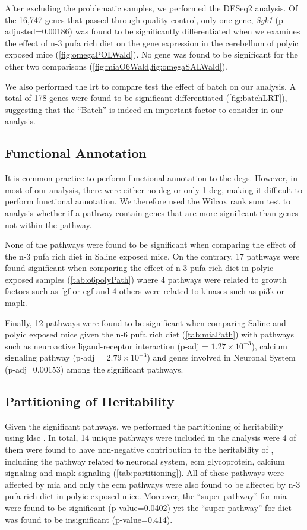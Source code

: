 After excluding the problematic samples, we performed the DESeq2 analysis.
Of the 16,747 genes that passed through quality control, only one gene, \textit{Sgk1} (p-adjusted=0.00186) was found to be significantly differentiated when we examines the effect of n-3 \gls{pufa} rich diet on the gene expression in the cerebellum of \gls{polyic} exposed mice (\cref{fig:omegaPOLWald}).
No gene was found to be significant for the other two comparisons (\cref{fig:miaO6Wald,fig:omegaSALWald}).

We also performed the \gls{lrt} to compare test the effect of batch on our analysis. 
A total of 178 genes were found to be significant differentiated (\cref{fig:batchLRT}), suggesting that the ``Batch'' is indeed an important factor to consider in our analysis.

\subsection{Functional Annotation}
It is common practice to perform functional annotation to the \glspl{deg}. 
However, in most of our analysis, there were either no \gls{deg} or only 1 \gls{deg}, making it difficult to perform functional annotation.
We therefore used the Wilcox rank sum test to analysis whether if a pathway contain genes that are more significant than genes not within the pathway.

None of the pathways were found to be significant when comparing the effect of the n-3 \gls{pufa} rich diet in Saline exposed mice. 
On the contrary, 17 pathways were found significant when comparing the effect of n-3 \gls{pufa} rich diet in \gls{polyic} exposed samples (\cref{tab:o6polyPath}) where 4 pathways were related to growth factors such as \gls{fgf} or \gls{egf} and 4 others were related to kinases such as \gls{pi3k} or \gls{mapk}.

Finally, 12 pathways were found to be significant when comparing Saline and \gls{polyic} exposed mice given the n-6 \gls{pufa} rich diet (\cref{tab:miaPath}) with pathways such as neuroactive ligand-receptor interaction (p-adj = $1.27\times10^{-3}$), calcium signaling pathway (p-adj = $2.79\times10^{-3}$) and genes involved in Neuronal System (p-adj=0.00153) among the significant pathways.

\subsection{Partitioning of Heritability}
Given the significant pathways, we performed the partitioning of heritability using \gls{ldsc} \citep{Bulik-Sullivan2015}.
In total, 14 unique pathways were included in the analysis were 4 of them were found to have non-negative contribution to the heritability of , including the pathway related to neuronal system, \gls{ecm} glycoprotein, calcium signaling and \gls{mapk} signaling (\cref{tab:partitioning}).
All of these pathways were affected by \gls{mia} and only the \gls{ecm} pathways were also found to be affected by n-3 \gls{pufa} rich diet in \gls{polyic} exposed mice.
Moreover, the ``super pathway'' for \gls{mia} were found to be significant (p-value=0.0402) yet the ``super pathway'' for diet was found to be insignificant (p-value=0.414).

